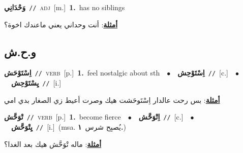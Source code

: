 \documentclass[10pt,a4paper,twoside]{article} %
\begin{document}
\begin{multicols}{2}
{\setlength\topsep{0pt}\textbf{\foreignlanguage{arabic}{وَحْدَانِي}}\ {\color{gray}\texttt{//}\color{black}}\ \textsc{adj}\ [m.]\ \textbf{1.}~has no siblings\  \begin{flushright}\color{gray}\foreignlanguage{arabic}{\textbf{\underline{\foreignlanguage{arabic}{أمثلة}}}: أنت وحداني يعني ماعندك اخوة؟}\end{flushright}\color{black}} \vspace{2mm}

\vspace{-3mm}
\subsection*{\color{blue}\foreignlanguage{arabic}{و.ح.ش}\color{blue}{}} 

{\setlength\topsep{0pt}\textbf{\foreignlanguage{arabic}{اِسْتَوْحَش}}\ {\color{gray}\texttt{//}\color{black}}\ \textsc{verb}\ [p.]\ \textbf{1.}~feel nostalgic about sth\ \ $\bullet$\ \ \setlength\topsep{0pt}\textbf{\foreignlanguage{arabic}{اِسْتَوْحِش}}\ {\color{gray}\texttt{//}\color{black}}\ [c.]\ \ $\bullet$\ \ \setlength\topsep{0pt}\textbf{\foreignlanguage{arabic}{يِسْتَوْحِش}}\ {\color{gray}\texttt{//}\color{black}}\ [i.]\  \begin{flushright}\color{gray}\foreignlanguage{arabic}{\textbf{\underline{\foreignlanguage{arabic}{أمثلة}}}: بس رحت عالدار اِسْتَوحَشت هيك وصرت أعيط زي الصغار بدي امي}\end{flushright}\color{black}} \vspace{2mm}

{\setlength\topsep{0pt}\textbf{\foreignlanguage{arabic}{تْوَحَّش}}\ {\color{gray}\texttt{//}\color{black}}\ \textsc{verb}\ [p.]\ \textbf{1.}~become fierce\ \ $\bullet$\ \ \setlength\topsep{0pt}\textbf{\foreignlanguage{arabic}{اِتْوَحَّش}}\ {\color{gray}\texttt{//}\color{black}}\ [c.]\ \ $\bullet$\ \ \setlength\topsep{0pt}\textbf{\foreignlanguage{arabic}{يِتْوَحَّش}}\ {\color{gray}\texttt{//}\color{black}}\ [i.]\ \color{gray}(msa. \foreignlanguage{arabic}{يُصبِح شرس}~\foreignlanguage{arabic}{\textbf{١.}})\color{black}\  \begin{flushright}\color{gray}\foreignlanguage{arabic}{\textbf{\underline{\foreignlanguage{arabic}{أمثلة}}}: ماله تْوَحَّش هيك بعد الغدا؟}\end{flushright}\color{black}} \vspace{2mm}


\end{multicols}
\end{document}
